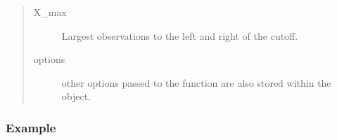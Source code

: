 \documentclass[letterpaper,10pt,english]{sphinxmanual}
\begin{document}
\begin{fulllineitems}
\begin{quote}
\begin{description}
\begin{description}
\item[{X\_max}] \leavevmode
\sphinxAtStartPar
Largest observations to the left and right of the cutoff.

\item[{options}] \leavevmode
\sphinxAtStartPar
other options passed to the function are also stored within the object.

\end{description}

\end{description}\end{quote}


\nopagebreak

\begin{description}
\item[{{\hyperref[\detokenize{rddensity:module-rddensity.rddensity}]{}}}] \leavevmode
\item[{{\hyperref[\detokenize{rdplotdensity:module-rddensity.rdplotdensity}]{}}}] \leavevmode
\end{description}



\end{fulllineitems}



\subsubsection{Example}
\label{\detokenize{rdbwdensity:example}}
\begin{sphinxVerbatim}[commandchars=\\\{\}]
   
   
  
   
\end{sphinxVerbatim}
\end{document}
